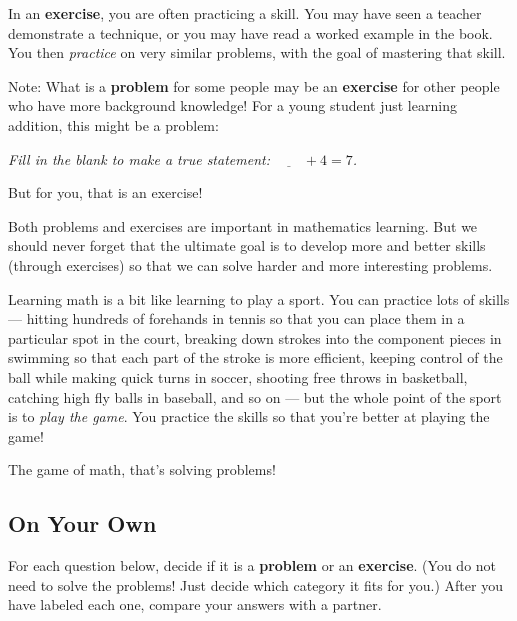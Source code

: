 In an {\bf exercise}, you are often practicing a skill.  You may have seen a teacher demonstrate a technique, or you may have read a worked example in the book.  You then \emph{practice} on very similar problems, with the goal of mastering that skill.


Note: What is a {\bf problem} for some people may be an {\bf exercise} for other people who have more background knowledge!  For a young student just learning addition, this might be a problem:  
\begin{center}
\emph{Fill in the blank to make a true statement: $\underline{\qquad} + 4 = 7$. }
\end{center}
But for you, that is an exercise!

Both problems and exercises are important in mathematics learning.  But we should never forget that the ultimate goal is to develop more and better skills (through exercises) so that we can solve harder and more interesting problems.  

Learning math is a bit like learning to play a sport.  You can practice lots of skills --- hitting hundreds of forehands in tennis so that you can place them in a particular spot in the court, breaking down strokes into the component pieces in swimming so that each part of the stroke is more efficient, keeping control of the ball while making quick turns in soccer, shooting free throws in basketball, catching high fly balls in baseball, and so on --- but the whole point of the sport is to \emph{play the game}.  You practice the skills so that you're better at playing the game!

The game of math, that's solving problems!

\subsection*{On Your Own}
For each question below, decide if it is a {\bf problem} or an {\bf exercise}.   (You do not need to solve the problems!  Just decide which category it fits for you.)  After you have labeled each one, compare your answers with a partner.


